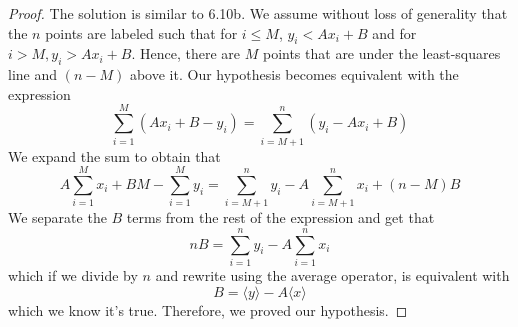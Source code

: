 \vspace{1em}

\begin{proof}
    The solution is similar to 6.10b. We assume without loss of generality that 
    the $n$ points are labeled such that for $i \leq M$,
    $y_i < Ax_i + B$ and  for $i > M, y_i > Ax_i + B$. Hence, there are $M$ 
    points that are under the least-squares line and $(n - M)$ above it. 
    Our hypothesis becomes equivalent with the expression
    \[
        \sum_{i = 1}^M (Ax_i + B - y_i) = \sum_{i = M + 1}^n (y_i - Ax_i + B)
    \] 
    We expand the sum to obtain that
    \[
        A \sum_{i = 1}^M x_i + BM - \sum_{i = 1}^M y_i 
        = \sum_{i = M + 1}^n y_i - A\sum_{i = M + 1}^n x_i + (n - M)B
    \] 
    We separate the $B$ terms from the rest of the expression and get that
    \[
        nB = \sum_{i = 1}^n y_i - A\sum_{i = 1}^n x_i 
    \] 
    which if we divide by $n$ and rewrite using the average operator, is equivalent with
    \begin{equation}\tag{6.49}
        B = \langle y \rangle - A \langle x \rangle
    \end{equation}
    which we know it's true. Therefore, we proved our hypothesis.
\end{proof}
